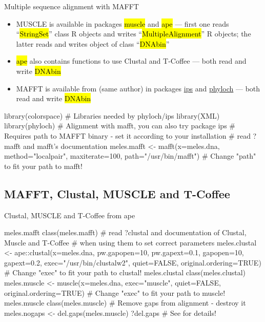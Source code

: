 \documentclass[compress, ucs, xelatex, 11pt, xcolor=svgnames,
  hyperref={
    bookmarks=true,
    unicode=true,
    colorlinks=true,
    pdftitle={Molecular data in R},
    plainpages=false,
    pdfauthor={Vojtech Zeisek},
    pdfsubject={Course about phylogeny and evolution in R},
    pdfcreator={XeLaTeX},
    pdfkeywords={R, evolution, phylogeny, molecular data},
    linkcolor=Tomato,
    anchorcolor=SaddleBrown,
    citecolor=Goldenrod,
    filecolor=DarkMagenta,
    menucolor=Sienna,
    urlcolor=DarkTurquoise,
    pdftex},
  url={hyphens, lowtilde} %
  ]{beamer}
\renewcommand{\texttt}[1]{\hl{\ttfamily #1}}
\begin{document}
\begin{frame}[fragile]{Multiple sequence alignment with MAFFT}
  \begin{itemize}
    \item MUSCLE is available in packages \texttt{muscle} and \texttt{ape} --- first one reads ``\texttt{*StringSet}'' class R objects and writes ``\texttt{*MultipleAlignment}'' R objects; the latter reads and writes object of class ``\texttt{DNAbin}''
    \item \texttt{ape} also contains functions to use Clustal and T-Coffee --- both read and write \texttt{DNAbin}
    \item MAFFT is available from (same author) in packages \href{https://CRAN.R-project.org/package=ips}{ips} and \href{http://www.christophheibl.de/Rpackages.html}{phyloch} --- both read and write \texttt{DNAbin}
  \end{itemize}
  \begin{spluscode}
    library(colorspace) # Libraries needed by phyloch/ips
    library(XML)
    library(phyloch) # Alignment with mafft, you can also try package ips
    # Requires path to MAFFT binary - set it according to your installation
    # read ?mafft and mafft's documentation
    meles.mafft <- mafft(x=meles.dna, method="localpair", maxiterate=100,
      path="/usr/bin/mafft") # Change "path" to fit your path to mafft!
  \end{spluscode}
\end{frame}

\subsection{MAFFT, Clustal, MUSCLE and T-Coffee}

\begin{frame}[fragile]{Clustal, MUSCLE and T-Coffee from ape}
  \begin{spluscode}
    meles.mafft
    class(meles.mafft)
    # read ?clustal and documentation of Clustal, Muscle and T-Coffee
    # when using them to set correct parameters
    meles.clustal <- ape::clustal(x=meles.dna, pw.gapopen=10, pw.gapext=0.1,
      gapopen=10, gapext=0.2, exec="/usr/bin/clustalw2", quiet=FALSE,
      original.ordering=TRUE) # Change "exec" to fit your path to clustal!
    meles.clustal
    class(meles.clustal)
    meles.muscle <- muscle(x=meles.dna, exec="muscle", quiet=FALSE,
      original.ordering=TRUE) # Change "exec" to fit your path to muscle!
    meles.muscle
    class(meles.muscle)
    # Remove gaps from alignment - destroy it
    meles.nogaps <- del.gaps(meles.muscle)
    ?del.gaps # See for details!
  \end{spluscode}
\end{frame}
\end{document}
